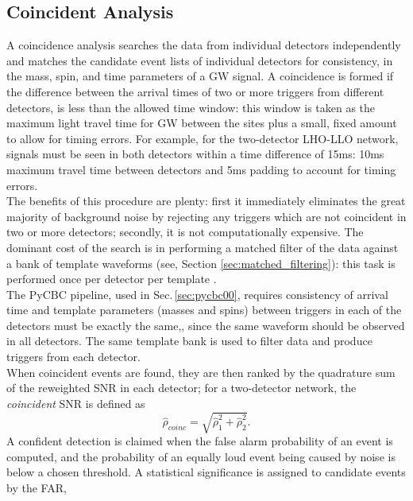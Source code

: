 \documentclass[binding=0.6cm, LaM]{sapthesis}
\begin{document}
\subsection{Coincident Analysis}
\label{subsec:coincident}
 	A coincidence analysis searches the data from individual detectors independently        
        and matches the candidate event lists of individual detectors for consistency,
        in the mass, spin, and time parameters of a GW signal.
	A coincidence is formed if the difference between the arrival times of two or more triggers from different detectors, 
	is less than the allowed time window:
	this window is taken as the maximum light travel time for GW between the sites plus a small, 
	fixed amount to allow for timing errors. 
	For example, for the two-detector LHO-LLO network, signals must be seen in both detectors within a time difference of 15ms: 
	10ms maximum travel time between detectors and 5ms padding to account for timing errors. \\
        The benefits of this procedure are plenty: first it immediately eliminates the great majority of background noise 
	by rejecting any triggers which are not coincident in two or more detectors;
	secondly, it is not computationally expensive.
        The dominant cost of the search is in performing a matched filter 
        of the data against a bank of template waveforms (see, Section \ref{sec:matched_filtering}):
        this task is performed once per detector per template \cite{28, 45}. \\
	The {\ttfamily PyCBC} pipeline, used in Sec.\,\ref{sec:pycbc00}, 
	requires consistency of arrival time and template parameters (masses and spins) 
	between triggers in each of the detectors must be exactly the same,,
	since the same waveform should be observed in all detectors.
	The same template bank is used to filter data and produce triggers from each detector. \\
	When coincident events are found, they are then ranked by the quadrature sum of the reweighted SNR in each detector;
	for a two-detector network, the \textit{coincident} SNR is defined as
		\begin{equation}
			\hat{\rho}_{coinc}  = \sqrt{\hat{\rho}^2_1 + \hat{\rho}^2_2}.
		\end{equation}
	A confident detection is claimed when the false alarm probability of an event is computed,
	and the probability of an equally loud event being caused by noise is below a chosen threshold. 
	A statistical significance is assigned to candidate events by the FAR,
\end{document}
